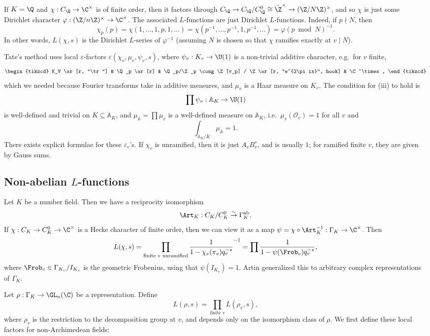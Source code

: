 \documentclass[a4paper]{article}
\newcommand\A{\mathbb{A}}
\newcommand\ab{\mathrm{ab}}
\begin{document}
If $K = \Q$ and $\chi: C_\Q \to \C^\times$ is of finite order, then it factors through $C_\Q \to C_\Q/C_\Q^0 \cong \hat{\Z}^\times \to (\Z/N\Z)^\times$, and so $\chi$ is just some Dirichlet character $\varphi: (\Z/n\Z)^\times \to \C^\times$. The associated $L$-functions are just Dirichlet $L$-functions. Indeed, if $p \nmid N$, then
\[
  \chi_p(p) = \chi(1, \ldots, 1, p, 1, \ldots) = \chi(p^{-1}, \ldots, p^{-1}, 1, p^{-1}, \ldots) = \varphi(p\bmod N)^{-1}.
\]
In other words, $L(\chi, s)$ is the Dirichlet $L$-series of $\varphi^{-1}$ (assuming $N$ is chosen so that $\chi$ ramifies exactly at $v \mid N$).

Tate's method uses local $\varepsilon$-factors $\varepsilon(\chi_v, \mu_v, \psi_v, s)$, where $\psi_v: K_v \to \U(1)$ is a non-trivial additive character, e.g.\ for $v$ finite,
\[
  \begin{tikzcd}
    K_V \ar[r, "\tr"] & \Q_p \ar[r] & \Q_p/\Z_p \cong \Z[v_p] / \Z \ar[r, "e^{2\pi ix}", hook] & \C^\times,
  \end{tikzcd}
\]
which we needed because Fourier transforms take in additive measures, and $\mu_v$ is a Haar measure on $K_v$. The condition for (iii) to hold is
\[
  \prod \psi_v: \A_K \to \U(1)
\]
is well-defined and trivial on $K \subseteq \A_K$, and $\mu_\A = \prod \mu_v$ is a well-defined measure on $\A_K$, i.e.\ $\mu_v(\mathcal{O}_v) = 1$ for all $v$ and
\[
  \int_{\A_K/K} \mu_\A = 1.
\]
There exists explicit formulae for these $\varepsilon_v$'s. If $\chi_v$ is unramified, then it is just $A_v B_v^s$, and is usually $1$; for ramified finite $v$, they are given by Gauss sums.

\subsection{Non-abelian \texorpdfstring{$L$}{L}-functions}
Let $K$ be a number field. Then we have a reciprocity isomorphism
\[
  \Art_K: C_K/C_K^0 \overset{\sim}{\to} \Gamma_K^{\ab}.
\]
If $\chi: C_K \to C_K^0 \to \C^\times$ is a Hecke character of finite order, then we can view it as a map $\psi = \chi \circ \Art_K^{-1}: \Gamma_K \to \C^\times$. Then
\[
  L(\chi, s) = \prod_{\text{finite }v\text{ unramified}} \frac{1}{1 - \chi_v(\pi_v) q_v^{-s}}^{-1} = \prod \frac{1}{1 - \psi(\Frob_v) q_v^{-s}},
\]
where $\Frob_v \in \Gamma_{K_v}/I_{K_v}$ is the geometric Frobenius, using that $\psi(I_{K_v}) = 1$. Artin generalized this to arbitrary complex representations of $\Gamma_K$.

Let $\rho: \Gamma_K \to \GL_n(\C)$ be a representation. Define
\[
  L(\rho, s) = \prod_{\text{finite }v} L(\rho_v, s),
\]
where $\rho_v$ is the restriction to the decomposition group at $v$, and depends only on the isomorphism class of $\rho$. We first define these local factors for non-Archimedean fields:
\end{document}
